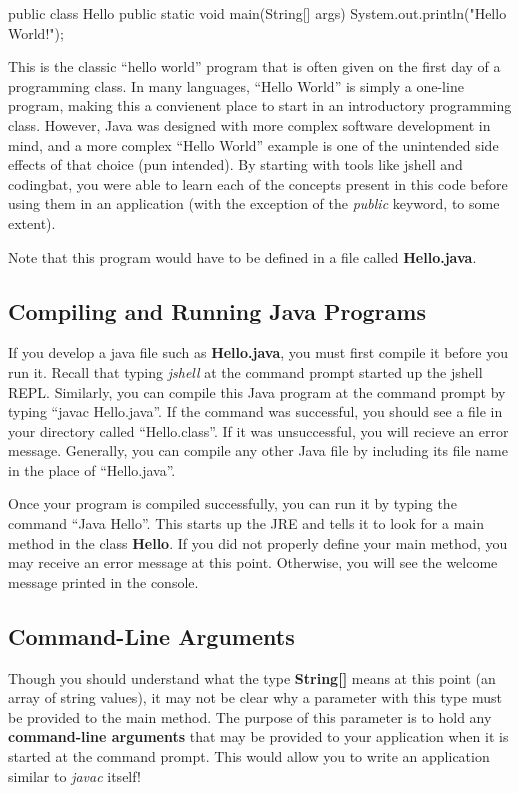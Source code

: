 \begin{code}
public class Hello {
  public static void main(String[] args) {
    System.out.println("Hello World!");
  }
}
\end{code}

This is the classic ``hello world'' program that is often given on the first day of a programming class. In many languages, ``Hello World'' is simply a one-line program, making this a convienent place to start in an introductory programming class. However, Java was designed with more complex software development in mind, and a more complex ``Hello World'' example is one of the unintended side effects of that choice (pun intended). By starting with tools like jshell and codingbat, you were able to learn each of the concepts present in this code before using them in an application (with the exception of the \textit{public} keyword, to some extent). 

Note that this program would have to be defined in a file called \textbf{Hello.java}. 

\subsection{Compiling and Running Java Programs}

If you develop a java file such as \textbf{Hello.java}, you must first compile it before you run it. Recall that typing \textit{jshell} at the command prompt started up the jshell REPL. Similarly, you can compile this Java program at the command prompt by typing ``javac Hello.java''. If the command was successful, you should see a file in your directory called ``Hello.class''. If it was unsuccessful, you will recieve an error message. Generally, you can compile any other Java file by including its file name in the place of ``Hello.java''. 

Once your program is compiled successfully, you can run it by typing the command ``Java Hello''. This starts up the JRE and tells it to look for a main method in the class \textbf{Hello}. If you did not properly define your main method, you may receive an error message at this point. Otherwise, you will see the welcome message printed in the console.   


\subsection{Command-Line Arguments}

Though you should understand what the type \textbf{String[]} means at this point (an array of string values), it may not be clear why a parameter with this type must be provided to the main method. The purpose of this parameter is to hold any \textbf{command-line arguments} that may be provided to your application when it is started at the command prompt. This would allow you to write an application similar to \textit{javac} itself! 

